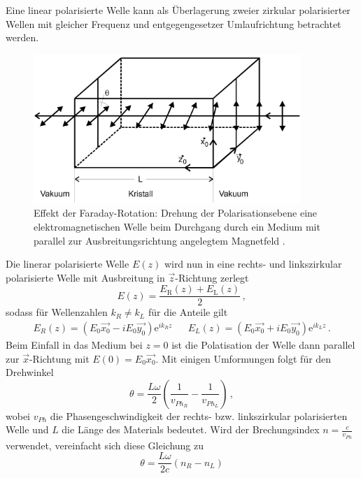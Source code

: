 Eine linear polarisierte Welle kann als Überlagerung zweier zirkular polarisierter Wellen mit gleicher Frequenz
und entgegengesetzer Umlaufrichtung betrachtet werden.
\FloatBarrier
\begin{figure}[h]
    \centering
    \includegraphics[width=0.9\textwidth]{rotation.png}
    \caption{Effekt der Faraday-Rotation: Drehung der Polarisationsebene eine elektromagnetischen Welle beim Durchgang durch ein Medium mit parallel zur Ausbreitungsrichtung angelegtem Magnetfeld \cite{quelle02}.}
    \label{fig:tfig2}
\end{figure}
\FloatBarrier
\noindent
Die linerar polarisierte Welle $E(z)$ wird nun in eine rechts- und linkszirkular polarisierte Welle mit Ausbreitung in 
$\vec{z}$-Richtung zerlegt
\begin{equation*}
    E(z) = \frac{E_\text{R}\left(z\right) + E_\text{L}\left(z\right)}{2} \, ,
\end{equation*}
sodass für Wellenzahlen $k_R \neq k_L$ für die Anteile gilt
\begin{align*}
    E_R (z) = \left(E_0 \vec{x_0} - i E_0 \vec{y_0}\right) \text{e}^{i k_R z} && E_L (z) = \left(E_0 \vec{x_0} + i E_0 \vec{y_0}\right) \text{e}^{i k_L z} \, .
\end{align*}
Beim Einfall in das Medium bei $z = 0$ ist die Polatisation der Welle dann parallel zur $\vec{x}$-Richtung mit $E(0) = E_0 \vec{x_0}$.
Mit einigen Umformungen folgt für den Drehwinkel
\begin{equation*}
    \theta = \frac{L \omega}{2} \left(\frac{1}{v_{Ph_R}} - \frac{1}{v_{Ph_L}}\right) \, ,
\end{equation*}
wobei $v_{Ph}$ die Phasengeschwindigkeit der rechts- bzw. linkszirkular polarisierten Welle und $L$ die Länge des Materials
bedeutet. 
Wird der Brechungsindex $n = \frac{c}{v_{Ph}}$ verwendet, vereinfacht sich diese Gleichung zu
\begin{equation*}
    \theta = \frac{L \omega}{2 c} \left(n_R - n_L\right)
\end{equation*}
